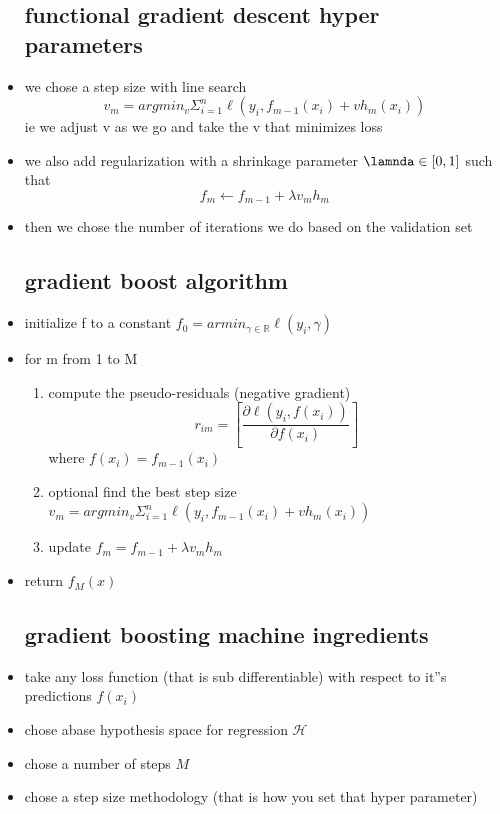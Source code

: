 \documentclass{article}
\begin{document}
\begin{itemize}
\subsection{functional gradient descent hyper parameters}
\item we chose a step size with line search $$v_{m}=argmin_{v}\Sigma_{i=1}^{n}\ell(y_i, f_{m-1}(x_i)+vh_m(x_i))$$ ie we adjust v as we go and take the v that minimizes loss
\item we also add regularization with a shrinkage parameter $\lamnda \in [0,1]$ such that $$f_{m}\leftarrow f_{m-1}+\lambda v_{m}h_m$$
\item then we chose the number of iterations we do based on the validation set 
\subsection{gradient boost algorithm}
\item initialize f to a constant $f_{0}=armin_{\gamma \in \mathbb{R}}\ell(y_i, \gamma)$
\item for m from 1 to M
\begin{enumerate}
    \item compute the pseudo-residuals (negative gradient) $$r_{im}=[\frac{\partial \ell(y_i,f(x_i))}{\partial f(x_i)}]$$ where $f(x_i)=f_{m-1}(x_i)$
    \item optional find the best step size $v_{m}=argmin_{v}\Sigma_{i=1}^{n}\ell(y_i, f_{m-1}(x_i)+vh_m(x_i))$
    \item update $f_m=f_{m-1}+\lambda v_m h_m$
\end{enumerate}
\item return $f_M(x)$
\subsection{gradient boosting machine ingredients }
\item take any loss function (that is sub differentiable) with respect to it''s predictions $f(x_i)$ 
\item chose  abase hypothesis space for regression $\mathcal{H}$
\item chose a number of steps $M$
\item chose a step size methodology (that is how you set that hyper parameter) 

\end{itemize}
\end{document}
